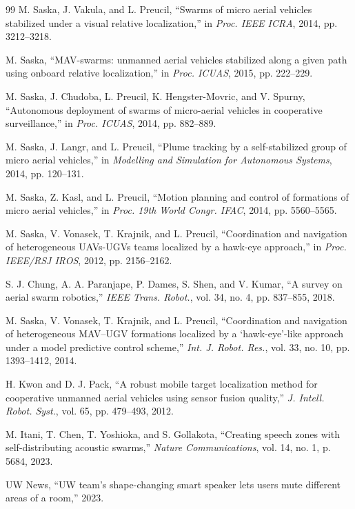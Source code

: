 \documentclass[letterpaper, 10pt, conference]{IEEEtran}
\begin{document}
\begin{thebibliography}{99}
M. Saska, J. Vakula, and L. Preucil, ``Swarms of micro aerial vehicles stabilized under a visual relative localization,'' in \emph{Proc. IEEE ICRA}, 2014, pp. 3212--3218.

M. Saska, ``{MAV}-swarms: unmanned aerial vehicles stabilized along a given path using onboard relative localization,'' in \emph{Proc. ICUAS}, 2015, pp. 222--229.

M. Saska, J. Chudoba, L. Preucil, K. Hengster-Movric, and V. Spurny, ``Autonomous deployment of swarms of micro-aerial vehicles in cooperative surveillance,'' in \emph{Proc. ICUAS}, 2014, pp. 882--889.

M. Saska, J. Langr, and L. Preucil, ``Plume tracking by a self-stabilized group of micro aerial vehicles,'' in \emph{Modelling and Simulation for Autonomous Systems}, 2014, pp. 120--131.

M. Saska, Z. Kasl, and L. Preucil, ``Motion planning and control of formations of micro aerial vehicles,'' in \emph{Proc. 19th World Congr. IFAC}, 2014, pp. 5560--5565.

M. Saska, V. Vonasek, T. Krajnik, and L. Preucil, ``Coordination and navigation of heterogeneous {UAV}s-{UGV}s teams localized by a hawk-eye approach,'' in \emph{Proc. IEEE/RSJ IROS}, 2012, pp. 2156--2162.

S. J. Chung, A. A. Paranjape, P. Dames, S. Shen, and V. Kumar, ``A survey on aerial swarm robotics,'' \emph{IEEE Trans. Robot.}, vol. 34, no. 4, pp. 837--855, 2018.

M. Saska, V. Vonasek, T. Krajnik, and L. Preucil, ``Coordination and navigation of heterogeneous {MAV}–{UGV} formations localized by a `hawk-eye'-like approach under a model predictive control scheme,'' \emph{Int. J. Robot. Res.}, vol. 33, no. 10, pp. 1393--1412, 2014.

H. Kwon and D. J. Pack, ``A robust mobile target localization method for cooperative unmanned aerial vehicles using sensor fusion quality,'' \emph{J. Intell. Robot. Syst.}, vol. 65, pp. 479--493, 2012.

M. Itani, T. Chen, T. Yoshioka, and S. Gollakota, ``Creating speech zones with self-distributing acoustic swarms,'' \emph{Nature Communications}, vol. 14, no. 1, p. 5684, 2023.

UW News, ``{UW} team's shape-changing smart speaker lets users mute different areas of a room,'' 2023.


\end{thebibliography}
\end{document}
